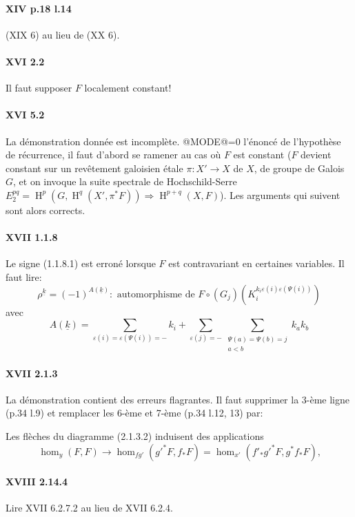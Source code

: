 \documentclass[oneside]{book}
\makeatletter
\DeclareMathOperator{\h}{H}
\theoremstyle{sga-source}
\theoremstyle{sga-source-dash}
\theoremstyle{sga-source-dotdash}
\theoremstyle{sga-source-number-note-dash}
\theoremstyle{sga-source-note-number-dotdash}
\theoremstyle{sga-source-example-dotdash}
\theoremstyle{sga-source-inline-number}
\theoremstyle{sga-source-bare-number}
\theoremstyle{sga-source}
\providecommand\EditionMode{@MODE@}
\DeclareRobustCommand{\EditionVariantMark}[2]{%
  \ifx\relax#1\relax\else
    \ifmmode
      \hbox{\raisebox{0.7ex}{\normalfont\scriptsize\color{EditionAppColor}%
        \hyperlink{apparatus:#1}{\EditionShortOccurrence{#1}}}}%
    \else
      \textsuperscript{\normalfont\scriptsize\color{EditionAppColor}%
        \hyperlink{apparatus:#1}{\EditionShortOccurrence{#1}}}%
    \fi
  \fi}
\def\EditionShortOccurrence#1{\expandafter\EditionShortOccurrenceAux#1\@nil}
\def\EditionShortOccurrenceAux#1-#2\@nil{\number#2\relax}
\DeclareRobustCommand{\var}[4][]{%
  \ifnum\EditionMode=0\relax
    \expandafter\@firstoftwo
  \else
    \expandafter\@secondoftwo
  \fi
  {#2}{\ifnum\EditionMode=1\relax\EditionVariantMark{#1}{#4}\fi#3}}
\def\EditionPDFVar[#1]#2#3#4{\ifnum\EditionMode=0\relax\expandafter\@firstoftwo\else\expandafter\@secondoftwo\fi{#2}{#3}}
\let\var\EditionPDFVar
\def\EditionVariantMark#1#2{}}
\makeatother
\begin{document}
\paragraph{XIV p.18 l.14}
(XIX 6) au lieu de (XX 6). 

\paragraph{XVI 2.2}
Il faut supposer $F$ localement constant!

\paragraph{XVI 5.2}
La démonstration donnée est incomplète. \var[FR-0312]{Arpès}{Après}{S45-SOL-1241} l'énoncé de 
l'hypothèse de récurrence, il faut d'abord se ramener au cas o\`u $F$ est 
constant ($F$ devient constant sur un rev\^etement galoisien étale 
$\pi:X'\to X$ de $X$, de groupe de Galois $G$, et on invoque la suite spectrale 
de Hochschild-Serre $E_2^{p q}=\h^p(G,\h^q(X',\pi^\ast F))\Rightarrow \h^{p+q}(X,F)$). 
Les arguments qui suivent sont alors corrects. 

\paragraph{XVII 1.1.8}
Le signe (1.1.8.1) est erroné lorsque $F$ est contravariant en certaines 
variables. Il faut lire: 
\begin{equation*}\tag{1.1.8.1}
  \rho^{\underline k} = (-1)^{A(\underline k)}: \text{ automorphisme de }
F\circ (G_j)\left(K_i^{k_i\varepsilon(i)\varepsilon(\Psi(i))}\right) 
\end{equation*}
avec 
\[
  A(\underline k) = \sum_{\varepsilon(i) = \varepsilon(\Psi(i))=-} k_i + \sum_{\varepsilon(j)=-} \sum_{\substack{\Psi(a)=\Psi(b)=j \\ a<b}} k_a k_b 
\]

\paragraph{XVII 2.1.3}
La démonstration contient des erreurs flagrantes. Il faut supprimer la 
3-ème ligne (p.34 l.9) et remplacer les 6-ème et 7-ème (p.34 l.12, 13) 
par: 

Les flèches du diagramme (2.1.3.2) induisent des applications 
\[
  \hom_y(F,F) \to \hom_{f g'}({g'}^\ast F,f_\ast F) = \hom_{x'}(f'_\ast {g'}^\ast F,g^\ast f_\ast F) \text{,}
\]

\paragraph{XVIII 2.14.4}
Lire XVII 6.2.7.2 au lieu de XVII 6.2.4.
\end{document}
